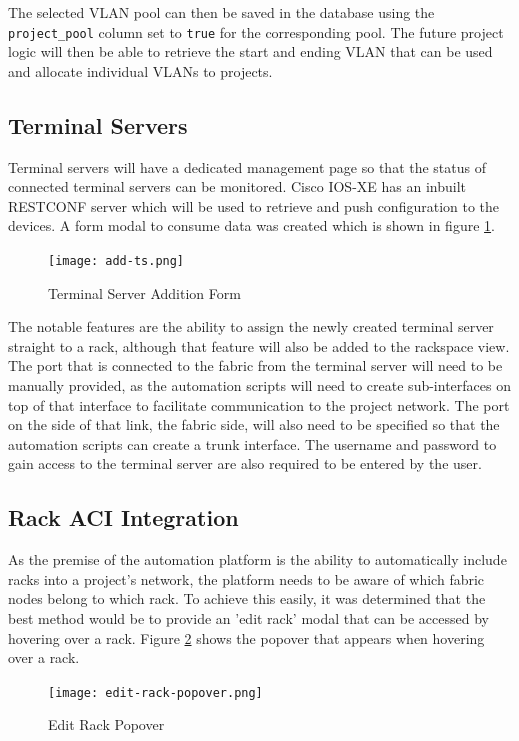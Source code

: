 The selected VLAN pool can then be saved in the database using the \verb|project_pool| column set to \verb|true| for the corresponding pool. The future project logic will then be able to retrieve the start and ending VLAN that can be used and allocate individual VLANs to projects.

\subsection{Terminal Servers}
Terminal servers will have a dedicated management page so that the status of connected terminal servers can be monitored. Cisco IOS-XE has an inbuilt RESTCONF server which will be used to retrieve and push configuration to the devices. A form modal to consume data was created which is shown in figure \ref{fig:terminal-server-form}.

\begin{figure}[H]
    \centering
    \texttt{[image: add-ts.png]}
    \caption{Terminal Server Addition Form}
    \label{fig:terminal-server-form}
\end{figure}

The notable features are the ability to assign the newly created terminal server straight to a rack, although that feature will also be added to the rackspace view.
The port that is connected to the fabric from the terminal server will need to be manually provided, as the automation scripts will need to create sub-interfaces on top of that interface to facilitate communication to the project network.
The port on the side of that link, the fabric side, will also need to be specified so that the automation scripts can create a trunk interface. The username and password to gain access to the terminal server are also required to be entered by the user.

\subsection{Rack ACI Integration}
As the premise of the automation platform is the ability to automatically include racks into a project's network, the platform needs to be aware of which fabric nodes belong to which rack. To achieve this easily, it was determined that the best method would be to provide an 'edit rack' modal that can be accessed by hovering over a rack. Figure \ref{fig:edit-rack-popover} shows the popover that appears when hovering over a rack.

\begin{figure}[H]
    \centering
    \texttt{[image: edit-rack-popover.png]}
    \caption{Edit Rack Popover}
    \label{fig:edit-rack-popover}
\end{figure}

